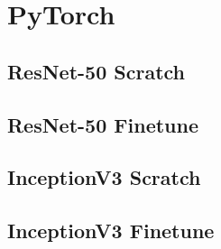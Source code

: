 \section{PyTorch}

\subsection{ResNet-50 Scratch}
\begin{figure}[H]

\end{figure}

\subsection{ResNet-50 Finetune}
\begin{figure}[H]

\end{figure}


\subsection{InceptionV3 Scratch}
\begin{figure}[H]

\end{figure}
\subsection{InceptionV3 Finetune}
\begin{figure}[H]

\end{figure}